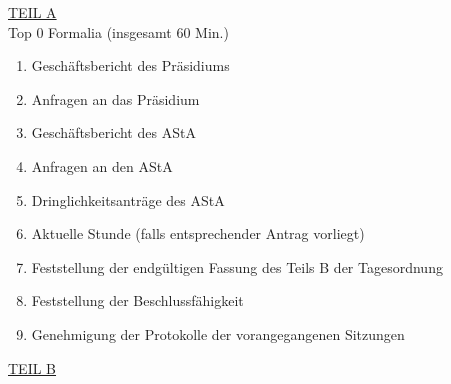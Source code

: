 \documentclass[ngerman,headheight=70pt]{scrartcl}
\begin{document}
    \underline{TEIL A}\\
    Top 0 Formalia (insgesamt 60 Min.)
    \begin{enumerate}
        \item Geschäftsbericht des Präsidiums
        \item Anfragen an das Präsidium
        \item Geschäftsbericht des AStA
        \item Anfragen an den AStA
        \item Dringlichkeitsanträge des AStA
        \item Aktuelle Stunde (falls entsprechender Antrag vorliegt)
        \item Feststellung der endgültigen Fassung des Teils B der Tagesordnung
        \item Feststellung der Beschlussfähigkeit
        \item Genehmigung der Protokolle der vorangegangenen Sitzungen
    \end{enumerate}
    \underline{TEIL B}\\
\end{document}
